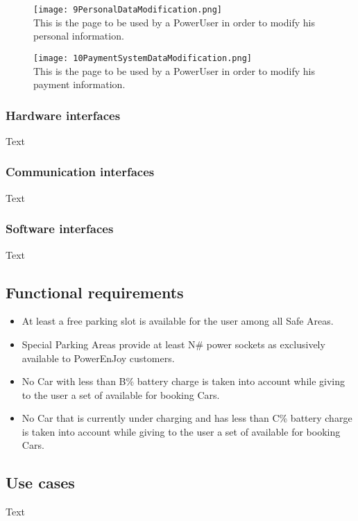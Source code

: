 \begin{figure}[p!]
    \centering
    \texttt{[image: 9PersonalDataModification.png]}
    \label{fig:9PersonalDataModification}
    \\This is the page to be used by a PowerUser in order to modify his personal information.
\end{figure}

\begin{figure}[h!]
    \centering
    \texttt{[image: 10PaymentSystemDataModification.png]}
    \label{fig:10PaymentSystemDataModificationForm}
    \\This is the page to be used by a PowerUser in order to modify his payment information.
\end{figure}

\subsubsection{Hardware interfaces}
Text
\subsubsection{Communication interfaces}
Text
\subsubsection{Software interfaces}
Text
\subsection{Functional requirements}
\begin{itemize}
\item At least a free parking slot is available for the user among all Safe Areas.
\item Special Parking Areas provide at least N\# power sockets as exclusively available to PowerEnJoy customers.
\item No Car with less than B\% battery charge is taken into account while giving to the user a set of available for booking Cars.
\item No Car that is currently under charging and has less than C\% battery charge is taken into account while giving to the user a set of available for booking Cars.
\end{itemize}
\subsection{Use cases}
Text